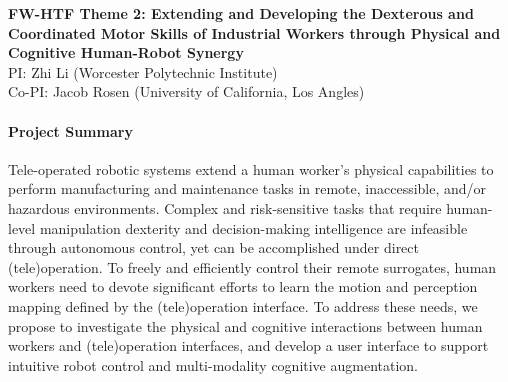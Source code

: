 \pagebreak

\begin{center}
	{\Large \bf FW-HTF Theme 2: \textbf{Extending and Developing the Dexterous and Coordinated Motor Skills of Industrial Workers through Physical and Cognitive Human-Robot Synergy}}\\
    \vspace{4pt}
   	{\large PI: Zhi Li (Worcester Polytechnic Institute)\\
    Co-PI: Jacob Rosen (University of California, Los Angles)}
\end{center}

\vspace{1 em}

\paragraph*{\Large Project Summary} 
Tele-operated robotic systems extend a human worker's physical capabilities to perform manufacturing and maintenance tasks in remote, inaccessible, and/or hazardous environments. Complex and risk-sensitive tasks that require human-level manipulation dexterity and decision-making intelligence are infeasible through autonomous control, yet can be accomplished under direct (tele)operation. To freely and efficiently control their remote surrogates, human workers need to devote significant efforts to learn the motion and perception mapping defined by the (tele)operation interface. To address these needs, we propose to investigate the physical and cognitive interactions between human workers and (tele)operation interfaces, and develop a user interface to support intuitive robot control and multi-modality cognitive augmentation. 

